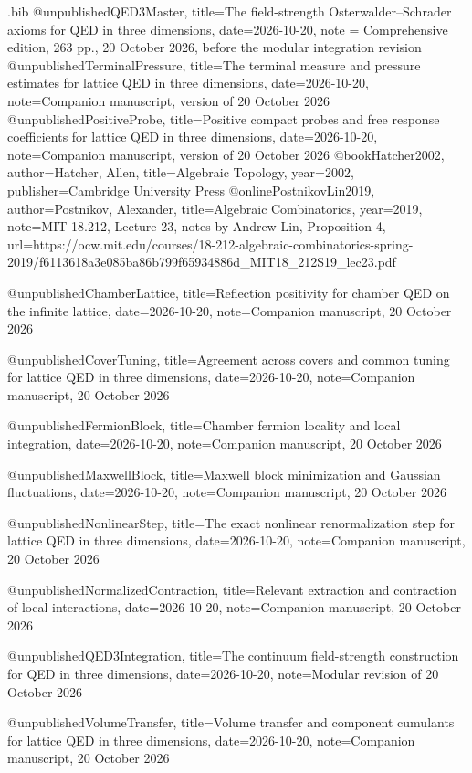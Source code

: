 \begin{filecontents*}[overwrite]{\jobname.bib}
@unpublished{QED3Master,
 title={The field-strength {Osterwalder--Schrader} axioms for {QED} in three dimensions},
 date={2026-10-20}, note = {Comprehensive edition, 263 pp., 20 October 2026, before the modular integration revision}}
@unpublished{TerminalPressure,
 title={The terminal measure and pressure estimates for lattice {QED} in three dimensions},
 date={2026-10-20}, note={Companion manuscript, version of 20 October 2026}}
@unpublished{PositiveProbe,
 title={Positive compact probes and free response coefficients for lattice {QED} in three dimensions},
 date={2026-10-20}, note={Companion manuscript, version of 20 October 2026}}
@book{Hatcher2002,
 author={Hatcher, Allen}, title={Algebraic Topology}, year={2002},
 publisher={Cambridge University Press}}
@online{PostnikovLin2019,
 author={Postnikov, Alexander}, title={Algebraic Combinatorics},
 year={2019}, note={MIT 18.212, Lecture 23, notes by Andrew Lin, Proposition 4},
 url={https://ocw.mit.edu/courses/18-212-algebraic-combinatorics-spring-2019/f6113618a3e085ba86b799f65934886d_MIT18_212S19_lec23.pdf}}

@unpublished{ChamberLattice,
 title={Reflection positivity for chamber {QED} on the infinite lattice},
 date={2026-10-20}, note={Companion manuscript, 20 October 2026}}

@unpublished{CoverTuning,
 title={Agreement across covers and common tuning for lattice {QED} in three dimensions},
 date={2026-10-20}, note={Companion manuscript, 20 October 2026}}

@unpublished{FermionBlock,
 title={Chamber fermion locality and local integration},
 date={2026-10-20}, note={Companion manuscript, 20 October 2026}}

@unpublished{MaxwellBlock,
 title={Maxwell block minimization and Gaussian fluctuations},
 date={2026-10-20}, note={Companion manuscript, 20 October 2026}}

@unpublished{NonlinearStep,
 title={The exact nonlinear renormalization step for lattice {QED} in three dimensions},
 date={2026-10-20}, note={Companion manuscript, 20 October 2026}}

@unpublished{NormalizedContraction,
 title={Relevant extraction and contraction of local interactions},
 date={2026-10-20}, note={Companion manuscript, 20 October 2026}}

@unpublished{QED3Integration,
 title={The continuum field-strength construction for {QED} in three dimensions},
 date={2026-10-20}, note={Modular revision of 20 October 2026}}

@unpublished{VolumeTransfer,
 title={Volume transfer and component cumulants for lattice {QED} in three dimensions},
 date={2026-10-20}, note={Companion manuscript, 20 October 2026}}
\end{filecontents*}
